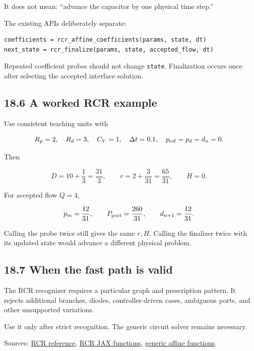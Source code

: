 \documentclass[11pt,a4paper]{article}
\begin{document}
It does not mean: \textquotedblleft{}advance the capacitor by one physical time step.\textquotedblright{}

The existing APIs deliberately separate:


\begin{lstlisting}
coefficients = rcr_affine_coefficients(params, state, dt)
next_state = rcr_finalize(params, state, accepted_flow, dt)
\end{lstlisting}
Repeated coefficient probes should not change \texttt{state}. Finalization occurs once after selecting the accepted interface solution.

\subsection{18.6 A worked RCR example}
Use consistent teaching units with


\begingroup\small
\[
R_p=2,\quad R_d=3,\quad C_V=1,\quad
\Delta t=0.1,\quad
p_{\rm ref}=p_d=d_n=0.
\]
\endgroup


Then


\begingroup\small
\[
D=10+\frac13=\frac{31}{3},
\qquad
r=2+\frac3{31}=\frac{65}{31},
\qquad H=0.
\]
\endgroup


For accepted flow \(Q=4\),


\begingroup\small
\[
p_m=\frac{12}{31},\qquad
P_{\rm port}=\frac{260}{31},\qquad
d_{n+1}=\frac{12}{31}.
\]
\endgroup


Calling the probe twice still gives the same \(r,H\). Calling the finalizer twice with its updated state would advance a different physical problem.

\subsection{18.7 When the fast path is valid}
The RCR recognizer requires a particular graph and prescription pattern. It rejects additional branches, diodes, controller-driven cases, ambiguous ports, and other unsupported variations.

Use it only after strict recognition. The generic circuit solver remains necessary.

Sources: \href{/home/sadid/crimson/cfs_reg/CRIMSONFlowsolver/flowsolver/netlist_py/src/RCR_reference.py}{RCR reference}, \href{/home/sadid/crimson/cfs_reg/CRIMSONFlowsolver/flowsolver/netlist_py/src/RCR_jax.py}{RCR JAX functions}, \href{/home/sadid/crimson/cfs_reg/CRIMSONFlowsolver/flowsolver/netlist_py/src/NetlistCircuit_jax.py}{generic affine functions}.
\end{document}
